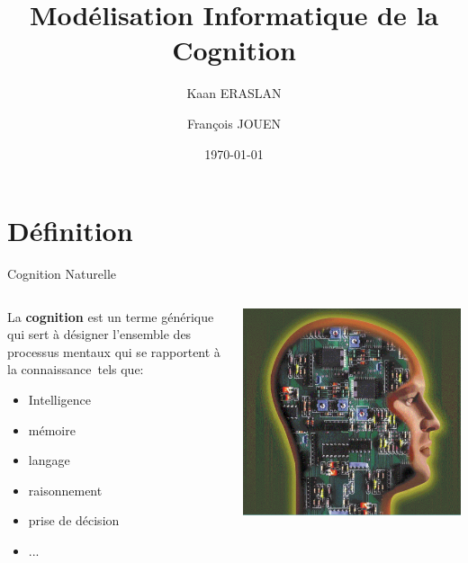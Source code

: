 \documentclass{beamer}
\title[Cognition Informatique]{Modélisation Informatique de la Cognition}
\author{Kaan ERASLAN \and François JOUEN}
\institute{EPHE - PSL}
\date{\today}
\begin{document}
\begin{frame}
  \titlepage
\end{frame}


\section{Définition}

\begin{frame}{Cognition Naturelle}
\begin{columns}
\begin{column}{.5\textwidth}
     \begin{block}{}
     La \textbf{cognition} est un terme générique qui sert à désigner l'ensemble des processus mentaux qui se rapportent à la connaissance tels que:
\begin{itemize}
  \item Intelligence
  \item mémoire
  \item langage
  \item raisonnement
  \item prise de décision
  \item ...
\end{itemize}

    \end{block}
    \end{column}
    \begin{column}{.5\textwidth}
    \begin{block}{}

    \includegraphics[width=\textwidth]{cognitionNaturelle.png}
    \end{block}
    \end{column}
\end{columns}
\end{frame}
\end{document}

